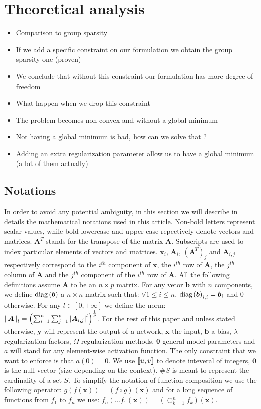 \section{Theoretical analysis}

\begin{itemize}
  \item Comparison to group sparsity
  \item If we add a specific constraint on our formulation we obtain the group sparsity one (proven)
  \item We conclude that without this constraint our formulation has more degree of freedom
  \item What happen when we drop this constraint
  \item The problem becomes non-convex and without a global minimum
  \item Not having a global minimum is bad, how can we solve that ?
  \item Adding an extra regularization parameter allow us to have a global minimum (a lot of them actually)
\end{itemize}

\subsection{Notations}

\par In order to avoid any potential ambiguity, in this section we will
describe in details the mathematical notations used in this article. Non-bold
letters represent scalar values, while bold lowercase and upper case
repectively denote vectors and matrices. $\bm{A}^T$ stands for the transpose of
the matrix $\bm{A}$. Subscripts are used to index particular elements of
vectors and matrices. $\bm{x}_i$, $\bm{A}_i$, $\left(\bm{A}^T\right)_j$ and
$\bm{A}_{i,j}$ respectively correspond to the $i^{th}$ component of $\bm{x}$,
the $i^{th}$ row of $\bm{A}$, the $j^{th}$ column of $\bm{A}$ and the $j^{th}$
component of the $i^{th}$ row of $\bm{A}$. All the following definitions assume
$\bm{A}$ to be an $n\times p$ matrix.  For any vetor $\bm{b}$ with $n$
components, we define $\text{diag}\left(\bm{b}\right)$ a $n\times n$ matrix such that: $\forall
1 \leq i \leq n$, $\text{diag}\left(\bm{b}\right)_{i, i} = \bm{b}_i$ and $0$ otherwise.  For any $l \in \left[0, +\infty\right]$ we define the norm: $\left\lVert\bm{A}\right\rVert_l =
\left(\sum_{i=1}^n \sum_{j=1}^p \left|\bm{A}_{i, j}\right|^l\right)^{\frac{1}{p}}$. For the rest of this paper and unless stated otherwise, $\bm{y}$ will represent the output of a network, $\bm{x}$ the input, $\bm{b}$ a bias, $\lambda$ regularization factors, $\Omega$ regularization methods, $\bm{\theta}$ general model parameters and $a$ will stand for any element-wise activation function. The only constraint that we want to enforce is that $a(0) = 0$. We use $\left\llbracket u, v\right\rrbracket$ to denote inteveral of integers, $\bm{0}$ is the null vector (size depending on the context). $\#S$ is meant to represent the cardinality of a set $S$. To simplify the notation of function composition we use the following operator: $g(f(\bm{x})) = (f \circ g)(\bm{x})$ and for a long sequence of functions from $f_1$ to $f_n$ we use: $f_n(...f_1(\bm{x})) = \left(\bigcirc_{k = 1}^n f_k\right)(\bm{x})$.
